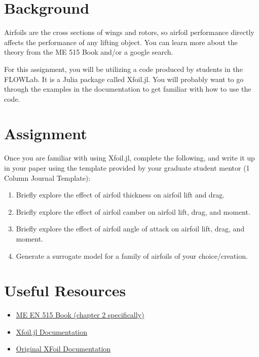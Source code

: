 \documentclass[12pt]{article}
\begin{document}
\section{Background}

Airfoils are the cross sections of wings and rotors, so airfoil performance directly affects the performance of any lifting object.
You can learn more about the theory from the ME 515 Book and/or a google search.

For this assignment, you will be utilizing a code produced by students in the FLOWLab.
It is a Julia package called Xfoil.jl.
You will probably want to go through the examples in the documentation to get familiar with how to use the code.


\section{Assignment}
Once you are familiar with using Xfoil.jl, complete the following, and write it up in your paper using the template provided by your graduate student mentor (1 Column Journal Template):

\begin{enumerate}
	\item Briefly explore the effect of airfoil thickness on airfoil lift and drag. 
	\item Briefly explore the effect of airfoil camber on airfoil lift, drag, and moment.
	\item Briefly explore the effect of airfoil angle of attack on airfoil lift, drag, and moment.
	\item Generate a surrogate model for a family of airfoils of your choice/creation.
\end{enumerate}


\section{Useful Resources}

\begin{itemize}
	\item \href{https://byu.box.com/shared/static/ywfayozbj3sr2ot6b32u8nqk5brqvurt.pdf}{ME EN 515 Book (chapter 2 specifically)}
	\item \href{https://flow.byu.edu/Xfoil.jl/stable/}{Xfoil.jl Documentation}
	\item \href{https://web.mit.edu/drela/Public/web/xfoil/}{Original XFoil Documentation}
\end{itemize}
\end{document}
